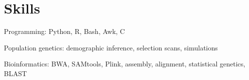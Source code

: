 \documentclass[letterpaper]{article}
\renewenvironment{itemize}{
  \begin{list}{}{
    \setlength{\leftmargin}{1em}
  }
}{
  \end{list}
}
\begin{document}
\section*{Skills}
\begin{itemize}
\item Programming: Python, R, Bash, Awk, C 
\item Population genetics: demographic inference, selection scans, simulations
\item Bioinformatics: BWA, SAMtools, Plink, assembly, alignment, statistical genetics, BLAST

\end{itemize}
\end{document}
